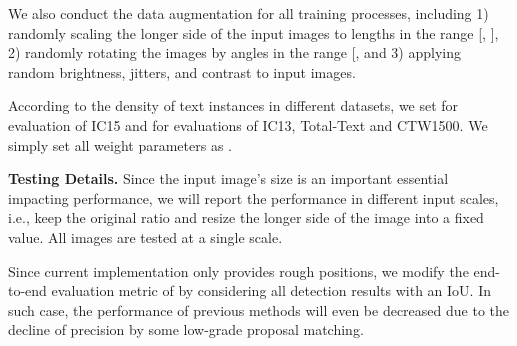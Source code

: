 \documentclass[letterpaper]{article} \usepackage{aaai21}  \usepackage{times}  \usepackage{helvet} \usepackage{courier}  \usepackage[hyphens]{url}  \usepackage{graphicx} \urlstyle{rm} \def\UrlFont{\rm}  \usepackage{natbib}  \usepackage{caption} \frenchspacing  \setlength{\pdfpagewidth}{8.5in}  \setlength{\pdfpageheight}{11in}  \usepackage{multirow}
\begin{document}
We also conduct the data augmentation for all training processes, including 1) randomly scaling the longer side of the input images to lengths in the range [, ], 2) randomly rotating the images by angles in the range [, and 3) applying random brightness, jitters, and contrast to input images.

According to the density of text instances in different datasets, we set  for evaluation of IC15 and  for evaluations of IC13, Total-Text and CTW1500.
We simply set all weight parameters as .

\textbf{Testing Details.}
Since the input image's size is an important essential impacting performance, we will report the performance in different input scales, i.e., keep the original ratio and resize the longer side of the image into a fixed value.
All images are tested at a single scale.

Since current implementation only provides rough positions, we modify the end-to-end evaluation metric of \cite{2011End} by considering all detection results with an IoU.
In such case, the performance of previous methods will even be decreased due to the decline of precision by some low-grade proposal matching.
\end{document}

